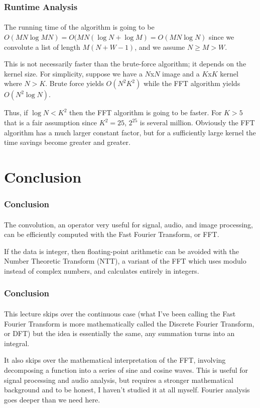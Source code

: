 \documentclass{beamer}                             %
\begin{document}
\begin{frame}
\frametitle{Runtime Analysis}
\framesubtitle{}
The running time of the algorithm is going to be
\( O(MN \log MN) = O(MN(\log N + \log M) = O(MN \log N) \) since we convolute 
a list of length \( M(N + W - 1) \), and we assume \( N \geq M > W \). \pause

This is not necessarily faster than the brute-force algorithm;
it depends on the kernel size. For simplicity, suppose we have a \( N \)x\( N \)
image and a \( K \)x\( K \) kernel where \( N > K \). Brute force yields
\( O(N^2 K^2) \) while the FFT algorithm yields \( O(N^2 \log N) \). \pause

Thus, if \( \log N < K^2 \) then the FFT algorithm is going to be faster.
For \( K > 5 \) that is a fair assumption since \( K^2 = 25 \), \( 2^{25} \)
is several million. Obviously the FFT algorithm has a much larger constant
factor, but for a sufficiently large kernel the time savings become greater
and greater.
\end{frame}

\section{Conclusion}

\begin{frame}
\frametitle{Conclusion}
\framesubtitle{}
The convolution, an operator very useful for signal, audio, and image
processing, can be efficiently computed with the Fast Fourier Transform, or FFT.
\pause

If the data is integer, then floating-point arithmetic can be avoided with the
Number Theoretic Transform (NTT), a variant of the FFT which uses modulo
instead of complex numbers, and calculates entirely in integers.
\end{frame}

\begin{frame}
\frametitle{Conclusion}
\framesubtitle{}
This lecture skips over the continuous case (what I've been calling the 
Fast Fourier Transform is more mathematically called the
\alert{Discrete Fourier Transform}, or DFT) but the idea is essentially the
same, any summation turns into an integral. \pause

It also skips over the mathematical interpretation of the FFT,
involving decomposing a function into a series of sine and cosine waves.
This is useful for signal processing and audio analysis,
but requires a stronger mathematical background and to be honest, I haven't
studied it at all myself. Fourier analysis goes deeper than we need here. 
\end{frame}
\end{document}
